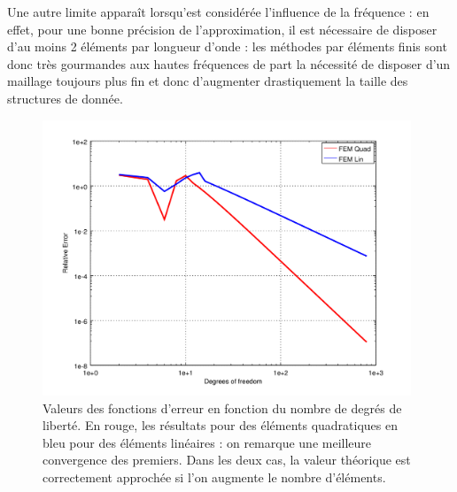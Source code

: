 Une autre limite apparaît lorsqu'est considérée l'influence de la fréquence : en effet, pour une bonne précision de
l'approximation, il est nécessaire de disposer d'au moins 2 éléments par longueur d'onde : les méthodes par éléments
finis sont donc très gourmandes aux hautes fréquences de part la nécessité de disposer d'un maillage toujours plus fin
et donc d'augmenter drastiquement la taille des structures de donnée.


\begin{figure}[!ht]
	\centering
	\includegraphics[width=11cm]{part1/figs/FEM/simuls_1D/convergence.png}
	\caption{\label{fig:FEM1D:simuls:convergence}Valeurs des fonctions d'erreur en fonction du nombre de degrés de
	liberté. En rouge, les résultats pour des éléments quadratiques en bleu pour des éléments linéaires : on
	remarque une meilleure convergence des premiers. Dans les deux cas, la valeur théorique est correctement approchée
	si l'on augmente le nombre d'éléments.}
\end{figure}

